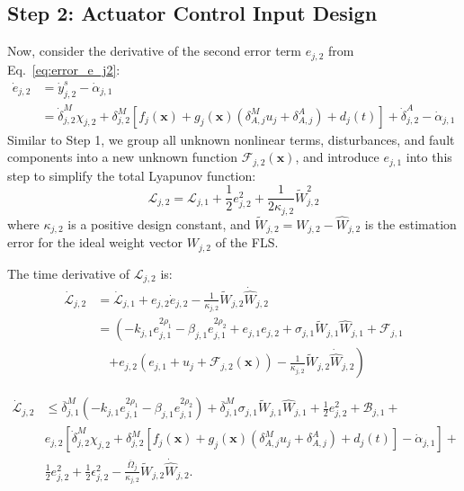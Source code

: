 \subsection{Step 2: Actuator Control Input Design}
Now, consider the derivative of the second error term $e_{j,2}$ from Eq.~\eqref{eq:error_e_j2}:
\begin{align}
    \dot{e}_{j,2} &= \dot{y}_{j,2}^s - \dot{\alpha}_{j,1} \nonumber \\
    &=  \dot{\delta}_{j,2}^M \chi_{j,2} + \delta_{j,2}^M \left[ f_j(\mathbf{x}) + g_j(\mathbf{x}) \left( \delta_{A,j}^M u_j + \delta_{A,j}^A \right) + d_j(t) \right] + \dot{\delta}_{j,2}^A  - \dot{\alpha}_{j,1} \label{eq:e_j2_dot_raw}
\end{align}
Similar to Step 1, we group all unknown nonlinear terms, disturbances, and fault components into a new unknown function $\mathcal{F}_{j,2}(\mathbf{x})$, and introduce $e_{j,1}$ into this step to simplify the total Lyapunov function:
\begin{equation}
    \mathcal{L}_{j,2} = \mathcal{L}_{j,1} + \frac{1}{2} e_{j,2}^2 + \frac{1}{2\kappa_{j,2}} \tilde{W}_{j,2}^2 \label{eq:lyapunov_Vj2}
\end{equation}
where $\kappa_{j,2}$ is a positive design constant, and $\tilde{W}_{j,2} = W_{j,2} - \hat{W}_{j,2}$ is the estimation error for the ideal weight vector $W_{j,2}$ of the FLS.

The time derivative of $\mathcal{L}_{j,2}$ is:
\begin{align}
    \dot{\mathcal{L}}_{j,2} &= \dot{\mathcal{L}}_{j,1} + e_{j,2} \dot{e}_{j,2} - \frac{1}{\kappa_{j,2}} \tilde{W}_{j,2} \dot{\hat{W}}_{j,2} \nonumber \\
    &= \left( -k_{j,1} e_{j,1}^{2\rho_1} - \beta_{j,1} e_{j,1}^{2\rho_2} + e_{j,1} e_{j,2} + \sigma_{j,1} \tilde{W}_{j,1} \hat{W}_{j,1} + \mathcal{F}_{j,1} \right. \nonumber \\
    &\quad \left. + e_{j,2} (e_{j,1} + u_j + \mathcal{F}_{j,2}(\mathbf{x})) - \frac{1}{\kappa_{j,2}} \tilde{W}_{j,2} \dot{\hat{W}}_{j,2} \right) \label{eq:Vj2_dot_expanded}
\end{align}

\begin{equation} \label{eq:dL_j2_subbed}
\begin{aligned}
\dot{\mathcal{L}}_{j,2} &\leq \overline{\delta}_{j,1}^M \left(-k_{j,1}e_{j,1}^{2\rho_{1}} - \beta_{j,1}e_{j,1}^{2\rho_{2}}\right) + \overline{\delta}_{j,1}^M \sigma_{j,1}\tilde{W}_{j,1}\hat{W}_{j,1} + \frac{1}{2}e_{j,2}^{2} + \mathcal{B}_{j,1} + \\
&e_{j,2}\left[\dot{\delta}_{j,2}^M \chi_{j,2} + \delta_{j,2}^M \left[f_j(\mathbf{x}) + g_j(\mathbf{x})\left(\delta_{A,j}^M u_j + \delta_{A,j}^A\right) + d_j(t)\right] - \dot{\alpha}_{j,1}\right] + \\
& \frac{1}{2}e_{j,2}^{2} + \frac{1}{2}\epsilon_{j,2}^{2} - \frac{\overline{\Omega}_{j}}{\kappa_{j,2}}\tilde{W}_{j,2}\dot{\hat{W}}_{j,2}.
\end{aligned}
\end{equation}

